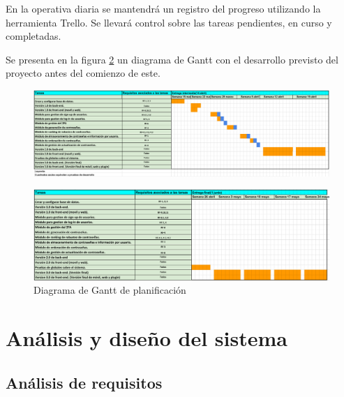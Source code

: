 \documentclass{article}
\begin{document}
En la operativa diaria se mantendrá un registro del progreso utilizando la herramienta Trello. Se llevará control sobre las tareas pendientes, en curso y completadas.

Se presenta en la figura \ref{gantt-2} un diagrama de Gantt con el desarrollo previsto del proyecto antes del comienzo de este.

\pagebreak

\begin{landscape}
   \begin{figure}[H]
       \centering
       \includegraphics[width=1.4\textheight]{../images/diag-gantt-1.png}
       \label{gantt-1}
   \end{figure}

   \begin{figure}[H]
       \centering
       \includegraphics[width=1.4\textheight]{../images/diag-gantt-2.png}
       \caption{Diagrama de Gantt de planificación}
       \label{gantt-2}
   \end{figure}
\end{landscape}

\pagebreak

\section{Análisis y diseño del sistema}

\subsection{Análisis de requisitos}
\end{document}

